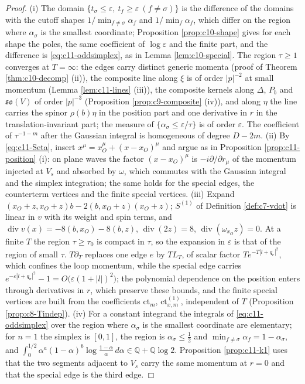 \begin{proof}
(i) The domain $\{t_\sigma\le\varepsilon,\ t_f\ge\varepsilon\ (f\ne\sigma)\}$ is the difference of the domains with the cutoff shapes $1/\min_{f\ne\sigma}\alpha_f$ and $1/\min_f\alpha_f$, which differ on the region where $\alpha_\sigma$ is the smallest coordinate; Proposition \ref{prop:c10-shape} gives for each shape the poles, the same coefficient of $\log\varepsilon$ and the finite part, and the difference is \eqref{eq:c11-oddsimplex}, as in Lemma \ref{lem:c10-special}. The region $\tau\ge1$ converges at $T=\infty$: the edges carry distinct generic momenta (proof of Theorem \ref{thm:c10-decomp} (ii)), the composite line along $\xi$ is of order $|p|^{-2}$ at small momentum (Lemma \ref{lem:c11-lines} (iii)), the composite kernels along $\Delta$, $P_b$ and $\mathfrak{so}(V)$ of order $|p|^{-3}$ (Proposition \ref{prop:c9-composite} (iv)), and along $\eta$ the line carries the spinor $\rho(b)\eta$ in the position part and one derivative in $r$ in the translation-invariant part; the measure of $\{\alpha_\sigma\le\varepsilon/\tau\}$ is of order $\varepsilon$. The coefficient of $\tau^{-1-m}$ after the Gaussian integral is homogeneous of degree $D-2m$. (ii) By \eqref{eq:c11-Seta}, insert $x^\mu=x_O^\mu+(x-x_O)^\mu$ and argue as in Proposition \ref{prop:c11-position} (i): on plane waves the factor $(x-x_O)^\mu$ is $-i\partial/\partial r_\mu$ of the momentum injected at $V_s$ and absorbed by $\omega$, which commutes with the Gaussian integral and the simplex integration; the same holds for the special edges, the counterterm vertices and the finite special vertices. (iii) Expand $(x_O+z,x_O+z)b-2(b,x_O+z)(x_O+z)$; $S^{(1)}$ of Definition \ref{def:c7-vdot} is linear in $v$ with its weight and spin terms, and $\operatorname{div}v(x)=-8(b,x_O)-8(b,z)$, $\operatorname{div}(2z)=8$, $\operatorname{div}(\omega_{x_O}z)=0$. At a finite $T$ the region $\tau\ge\tau_0$ is compact in $\tau$, so the expansion in $\varepsilon$ is that of the region of small $\tau$. $T\partial_T$ replaces one edge $e$ by $TL_T$, of scalar factor $Te^{-T|l+q_e|^2}$, which confines the loop momentum, while the special edge carries $e^{-\varepsilon|l+q_\sigma|^2}-1=O\big(\varepsilon(1+|l|)^2\big)$; the polynomial dependence on the position enters through derivatives in $r$, which preserve these bounds, and the finite special vertices are built from the coefficients $\mathrm{ct}_m$, $\mathrm{ct}^{(1)}_{x,m}$, independent of $T$ (Proposition \ref{prop:c8-Tindep}). (iv) For a constant integrand the integrals of \eqref{eq:c11-oddsimplex} over the region where $\alpha_\sigma$ is the smallest coordinate are elementary; for $n=1$ the simplex is $[0,1]$, the region is $\alpha_\sigma\le\tfrac12$ and $\min_{f\ne\sigma}\alpha_f=1-\alpha_\sigma$, and $\int_0^{1/2}\alpha^a(1-\alpha)^b\log\frac{1-\alpha}\alpha\,d\alpha\in\mathbb Q+\mathbb Q\log2$. Proposition \ref{prop:c11-k1} uses that the two segments adjacent to $V_s$ carry the same momentum at $r=0$ and that the special edge is the third edge.
\end{proof}

